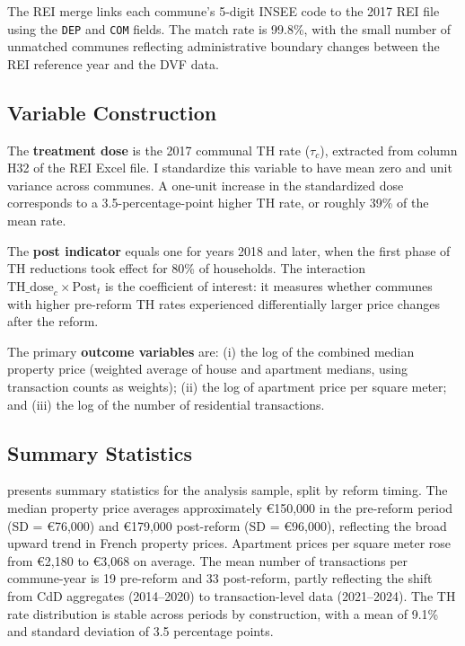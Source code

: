\documentclass[12pt]{article}
\begin{document}
The REI merge links each commune's 5-digit INSEE code to the 2017 REI file using the \texttt{DEP} and \texttt{COM} fields. The match rate is 99.8\%, with the small number of unmatched communes reflecting administrative boundary changes between the REI reference year and the DVF data.

\subsection{Variable Construction}

The \textbf{treatment dose} is the 2017 communal TH rate ($\tau_c$), extracted from column H32 of the REI Excel file. I standardize this variable to have mean zero and unit variance across communes. A one-unit increase in the standardized dose corresponds to a 3.5-percentage-point higher TH rate, or roughly 39\% of the mean rate.

The \textbf{post indicator} equals one for years 2018 and later, when the first phase of TH reductions took effect for 80\% of households. The interaction $\text{TH\_dose}_c \times \text{Post}_t$ is the coefficient of interest: it measures whether communes with higher pre-reform TH rates experienced differentially larger price changes after the reform.

The primary \textbf{outcome variables} are: (i) the log of the combined median property price (weighted average of house and apartment medians, using transaction counts as weights); (ii) the log of apartment price per square meter; and (iii) the log of the number of residential transactions.

\subsection{Summary Statistics}

 presents summary statistics for the analysis sample, split by reform timing. The median property price averages approximately \euro{}150,000 in the pre-reform period (SD = \euro{}76,000) and \euro{}179,000 post-reform (SD = \euro{}96,000), reflecting the broad upward trend in French property prices. Apartment prices per square meter rose from \euro{}2,180 to \euro{}3,068 on average. The mean number of transactions per commune-year is 19 pre-reform and 33 post-reform, partly reflecting the shift from CdD aggregates (2014--2020) to transaction-level data (2021--2024). The TH rate distribution is stable across periods by construction, with a mean of 9.1\% and standard deviation of 3.5 percentage points.
\end{document}
